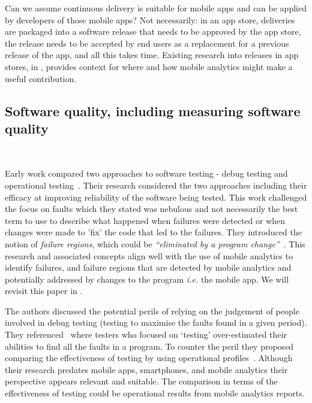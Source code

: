 Can we assume continuous delivery is suitable for mobile apps and can be applied by developers of those mobile apps? Not necessarily: in an app store, deliveries are packaged into a software release that needs to be approved by the app store, the release needs to be accepted by end users as a replacement for a previous release of the app, and all this takes time. Existing research into releases in app stores, in , provides context for where and how mobile analytics might make a useful contribution.

\subsection{Software quality, including measuring software quality}~\label{rw-software-quality-including-measurement-topic}

Early work compared two approaches to software testing - debug testing and operational testing~. Their research considered the two approaches including their efficacy at improving reliability of the software being tested. This work challenged the focus on faults which they stated was nebulous and not necessarily the best term to use to describe what happened when failures were detected or when changes were made to 'fix' the code that led to the failures. They introduced the notion of \emph{failure regions}, which could be \emph{``eliminated by a program change''}~. This research and associated concepts align well with the use of mobile analytics to identify failures, and failure regions that are detected by mobile analytics and potentially addressed by changes to the program \emph{i.e.} the mobile app. We will revisit this paper in .

The authors discussed the potential perils of relying on the judgement of people involved in debug testing (testing to maximise the faults found in a given period). They referenced~ where testers who focused on `testing' over-estimated their abilities to find all the faults in a program. To counter the peril they proposed comparing the effectiveness of testing by using operational profiles~. Although their research predates mobile apps, smartphones, and mobile analytics their perspective appears relevant and suitable. The comparison in terms of the effectiveness of testing could be operational results from mobile analytics reports.

